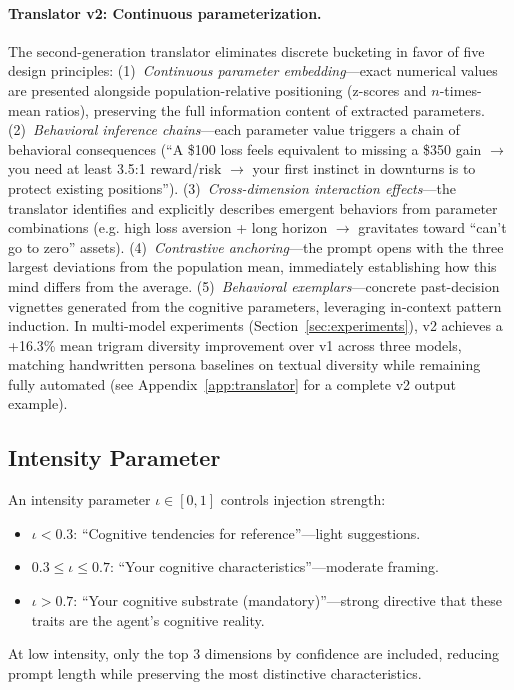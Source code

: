 \documentclass[11pt]{article}
\newcommand{\eg}{e.g.}
\begin{document}
\paragraph{Translator v2: Continuous parameterization.}
The second-generation translator eliminates discrete bucketing in favor of five design principles: (1)~\emph{Continuous parameter embedding}---exact numerical values are presented alongside population-relative positioning (z-scores and $n$-times-mean ratios), preserving the full information content of extracted parameters. (2)~\emph{Behavioral inference chains}---each parameter value triggers a chain of behavioral consequences (``A \$100 loss feels equivalent to missing a \$350 gain $\to$ you need at least 3.5:1 reward/risk $\to$ your first instinct in downturns is to protect existing positions''). (3)~\emph{Cross-dimension interaction effects}---the translator identifies and explicitly describes emergent behaviors from parameter combinations (\eg{} high loss aversion + long horizon $\to$ gravitates toward ``can't go to zero'' assets). (4)~\emph{Contrastive anchoring}---the prompt opens with the three largest deviations from the population mean, immediately establishing how this mind differs from the average. (5)~\emph{Behavioral exemplars}---concrete past-decision vignettes generated from the cognitive parameters, leveraging in-context pattern induction. In multi-model experiments (Section~\ref{sec:experiments}), v2 achieves a +16.3\% mean trigram diversity improvement over v1 across three models, matching handwritten persona baselines on textual diversity while remaining fully automated (see Appendix~\ref{app:translator} for a complete v2 output example).

\subsection{Intensity Parameter}

An intensity parameter $\iota \in [0, 1]$ controls injection strength:
\begin{itemize}[leftmargin=*,itemsep=1pt]
    \item $\iota < 0.3$: ``Cognitive tendencies for reference''---light suggestions.
    \item $0.3 \leq \iota \leq 0.7$: ``Your cognitive characteristics''---moderate framing.
    \item $\iota > 0.7$: ``Your cognitive substrate (mandatory)''---strong directive that these traits are the agent's cognitive reality.
\end{itemize}
At low intensity, only the top 3 dimensions by confidence are included, reducing prompt length while preserving the most distinctive characteristics.
\end{document}

